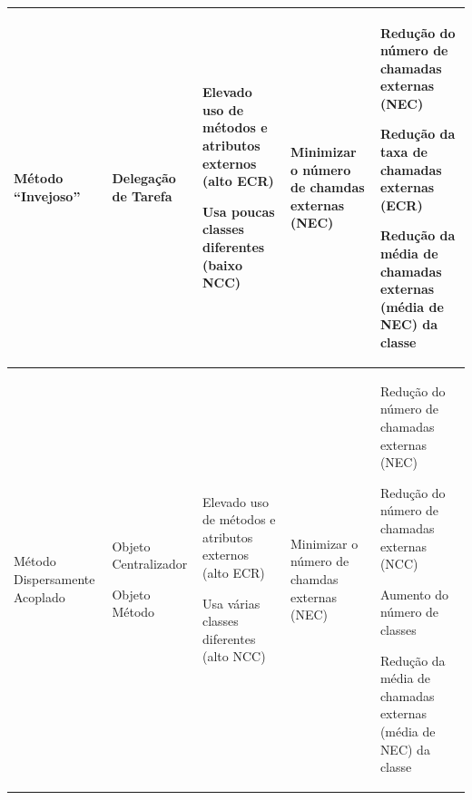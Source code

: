 \begin{landscape}
\begin{table}[hbt]
\begin{tabular}{|p{3cm}|p{4.5cm}|p{5.0cm}|p{5.5cm}|p{5.0cm}|}
 
\hline 
Método ``Invejoso''
& \begin{my_itemize}
    \item Delegação de Tarefa
  \end{my_itemize}
& \begin{my_itemize}                            
    \item Elevado uso de métodos e atributos externos (alto ECR)
	\item Usa poucas classes diferentes (baixo NCC)
  \end{my_itemize}
& \begin{my_itemize}
	\item Minimizar o número de chamdas externas (NEC)
  \end{my_itemize}
& \begin{my_itemize}                           
	\item Redução do número de chamadas externas (NEC)
	\item Redução da taxa de chamadas externas (ECR)  
	\item Redução da média de chamadas externas (média de NEC) da classe
  \end{my_itemize}
\tabularnewline                              
                                                                        
\hline 
Método Dispersamente Acoplado
& \begin{my_itemize}
    \item Objeto Centralizador
	\item Objeto Método
  \end{my_itemize}
& \begin{my_itemize}                            
    \item Elevado uso de métodos e atributos externos (alto ECR)
	\item Usa várias classes diferentes (alto NCC)
  \end{my_itemize}
& \begin{my_itemize}
	\item Minimizar o número de chamdas externas (NEC)
  \end{my_itemize}
& \begin{my_itemize}                           
	\item Redução do número de chamadas externas (NEC)
	\item Redução do número de chamadas externas (NCC)
	\item Aumento do número de classes 
	\item Redução da média de chamadas externas (média de NEC) da classe
  \end{my_itemize}
\tabularnewline                       


\end{tabular}
\end{table}
\end{landscape}
